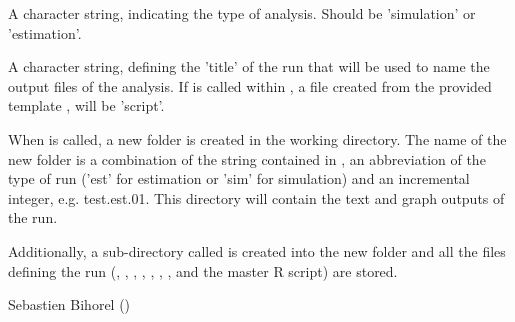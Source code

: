 \begin{Arguments}
\begin{ldescription}
\begin{description}
\end{description}


\item[\code{runtype}] A character string, indicating the type of analysis. Should be
'simulation' or 'estimation'.
\item[\code{analysis}] A character string, defining the 'title' of the run that will
be used to name the output files of the analysis. If
 is called within , a file created
from the provided template ,  will be 'script'.
\end{ldescription}
\end{Arguments}
%
\begin{Value}
When  is called, a new folder is created in the 
working directory. The name of the new folder is a combination of the string
contained in , an abbreviation of the type of run ('est'
for estimation or 'sim' for simulation) and an incremental integer, e.g.
test.est.01. This directory will contain the text and graph outputs of the
run.

Additionally, a sub-directory called  is created into
the new folder and all the files defining the run (,
, , , ,
, , and the master R script) are stored.
\end{Value}
%
\begin{Author}\relax
Sebastien Bihorel ()
\end{Author}
%
\begin{SeeAlso}\relax
{}
\end{SeeAlso}
